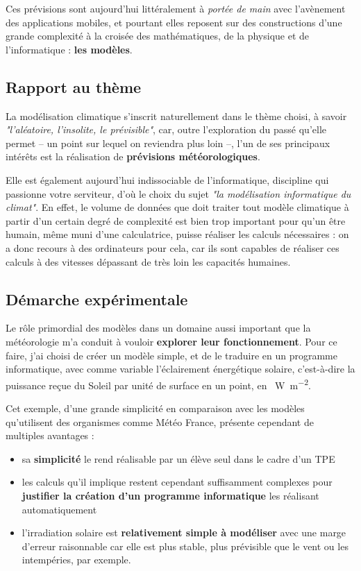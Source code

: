 \documentclass[12pt]{article}
\begin{document}
Ces prévisions sont aujourd'hui littéralement à \emph{portée de main} avec l'avènement des applications mobiles, et pourtant elles reposent sur des constructions d'une grande complexité à la croisée des mathématiques, de la physique et de l'informatique : \textbf{les modèles}.
\subsection{Rapport au thème}

La modélisation climatique s'inscrit naturellement dans le thème choisi, à savoir \emph{"l'aléatoire, l'insolite, le prévisible"}, car, outre l'exploration du passé qu'elle permet -- un point sur lequel on reviendra plus loin --, l'un de ses principaux intérêts est la réalisation de \textbf{prévisions météorologiques}. %

Elle est également aujourd'hui indissociable de l'informatique, discipline qui passionne votre serviteur, d'où le choix du sujet \emph{"la modélisation informatique du climat"}.
En effet, le volume de données que doit traiter tout modèle climatique à partir d'un certain degré de complexité est bien trop important pour qu'un être humain, même muni d'une calculatrice, puisse réaliser les calculs nécessaires : on a donc recours à des ordinateurs pour cela, car ils sont capables de réaliser ces calculs à des vitesses dépassant de très loin les capacités humaines.

\subsection{Démarche expérimentale}

Le rôle primordial des modèles dans un domaine aussi important que la météorologie m'a conduit à vouloir \textbf{explorer leur fonctionnement}.
Pour ce faire, j'ai choisi de créer un modèle simple, et de le traduire en un programme informatique, avec comme variable l'éclairement énergétique solaire, c'est-à-dire la puissance reçue du Soleil par unité de surface en un point, en \SI{}{\watt\per\square\meter}.

Cet exemple, d'une grande simplicité en comparaison avec les modèles qu'utilisent des organismes comme Météo France, présente cependant de multiples avantages :

\begin{itemize}
  \item sa \textbf{simplicité} le rend réalisable par un élève seul dans le cadre d'un TPE
  \item les calculs qu'il implique restent cependant suffisamment complexes pour \textbf{justifier la création d'un programme informatique} les réalisant automatiquement
  \item l'irradiation solaire est \textbf{relativement simple à modéliser} avec une marge d'erreur raisonnable car elle est plus stable, plus prévisible que le vent ou les intempéries, par exemple.
\end{itemize}
\end{document}
